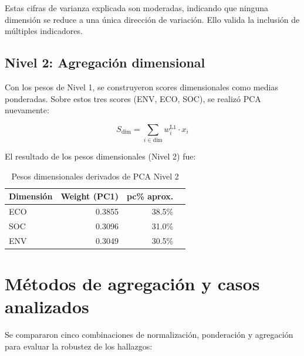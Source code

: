 Estas cifras de varianza explicada son moderadas, indicando que ninguna dimensión se reduce a una única dirección de variación. Ello valida la inclusión de múltiples indicadores.

\subsection{Nivel 2: Agregación dimensional}

Con los pesos de Nivel 1, se construyeron scores dimensionales como medias ponderadas. Sobre estos tres scores (ENV, ECO, SOC), se realizó PCA nuevamente:

\begin{equation}
    S_{\text{dim}} = \sum_{i \in \text{dim}} w_i^{\text{L1}} \cdot x_i
\end{equation}

El resultado de los pesos dimensionales (Nivel 2) fue:

\begin{table}[H]
    \centering
    \small
    \begin{tabular}{lrrr}
        \toprule
        \textbf{Dimensión} & \textbf{Weight (PC1)} & \textbf{pc\% aprox.} \\
        \midrule
        ECO & 0.3855 & 38.5\% \\
        SOC & 0.3096 & 31.0\% \\
        ENV & 0.3049 & 30.5\% \\
        \bottomrule
    \end{tabular}
    \caption{Pesos dimensionales derivados de PCA Nivel 2}
    \label{tab:pesos_nivel2}
\end{table}

\section{Métodos de agregación y casos analizados}

Se compararon cinco combinaciones de normalización, ponderación y agregación para evaluar la robustez de los hallazgos:

